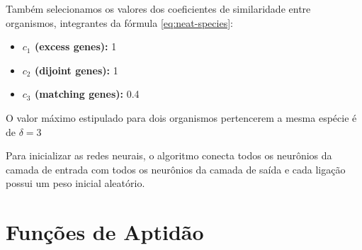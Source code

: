Também selecionamos os valores dos coeficientes de similaridade entre
organismos, integrantes da fórmula \ref{eq:neat-species}:

\begin{itemize}
	\item \textbf{$c_1$ (excess genes):} 1
	\item \textbf{$c_2$ (dijoint genes):} 1
	\item \textbf{$c_3$ (matching genes):} 0.4
\end{itemize}

O valor máximo estipulado para dois organismos pertencerem a mesma espécie é de
$\delta = 3$

Para inicializar as redes neurais, o algoritmo conecta todos os neurônios da
camada de entrada com todos os neurônios da camada de saída e cada ligação
possui um peso inicial aleatório.




\section{\label{section:modelling-fitness}Funções de Aptidão}



